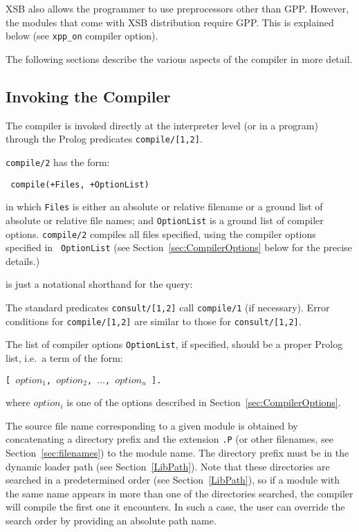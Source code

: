 XSB also allows the programmer to use preprocessors other than GPP.
However, the modules that come with XSB distribution require GPP.
This is explained below (see \verb|xpp_on| compiler option).

The following sections describe the various aspects of the compiler 
in more detail.


\subsection{Invoking the Compiler} \label{compiler_invoking}

The compiler is invoked directly at the interpreter level (or in a 
program) through the Prolog predicates {\tt compile/[1,2]}.  

 {\tt compile/2} has the form: 
\begin{center}{\tt	
	compile(+Files, +OptionList)
}
\end{center}
in which {\tt Files} is either an absolute or relative filename or a
ground list of absolute or relative file names; and {\tt OptionList}
is a ground list of compiler options.  {\tt compile/2} compiles all
files specified, using the compiler options specified in {\tt
OptionList} (see Section~\ref{sec:CompilerOptions} below for the
precise details.)


\noindent
is just a notational shorthand for the query:


The standard predicates {\tt consult/[1,2]} call {\tt compile/1} (if
necessary).  Error conditions for {\tt compile/[1,2]} are similar to
those for {\tt consult/[1,2]}.

The list of compiler options {\tt OptionList}, if specified, 
should be a proper Prolog list, i.e.\ a term of the form:
\begin{center}
	{\tt [ $option_1$, $option_2$, $\ldots$, $option_n$ ].}
\end{center}
where $option_i$ is one of the options described in
Section~\ref{sec:CompilerOptions}.

The source file name corresponding to a given module is obtained by 
concatenating a directory prefix and the extension {\tt .P} (or other
filenames, see Section~\ref{sec:filenames}) 
to the module name.  The directory prefix must be in the
dynamic loader path (see Section~\ref{LibPath}).
Note that these directories are searched in a predetermined
order (see Section~\ref{LibPath}), so if a module with the same name
appears in more than one of the directories searched, the compiler 
will compile the first one it encounters.  In such a case, the user can 
override the search order by providing an absolute path name.

